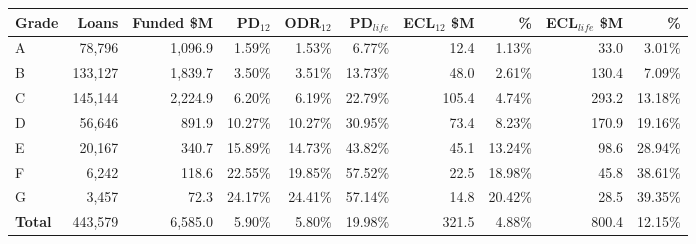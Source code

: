 \begin{tabular}{lrrrrrrrrr}
\toprule
Grade & Loans & Funded \$M & PD$_{12}$ & ODR$_{12}$ & PD$_{life}$ & ECL$_{12}$ \$M & \% & ECL$_{life}$ \$M & \% \\
\midrule
A & 78,796 & 1,096.9 & 1.59\% & 1.53\% & 6.77\% & 12.4 & 1.13\% & 33.0 & 3.01\% \\
B & 133,127 & 1,839.7 & 3.50\% & 3.51\% & 13.73\% & 48.0 & 2.61\% & 130.4 & 7.09\% \\
C & 145,144 & 2,224.9 & 6.20\% & 6.19\% & 22.79\% & 105.4 & 4.74\% & 293.2 & 13.18\% \\
D & 56,646 & 891.9 & 10.27\% & 10.27\% & 30.95\% & 73.4 & 8.23\% & 170.9 & 19.16\% \\
E & 20,167 & 340.7 & 15.89\% & 14.73\% & 43.82\% & 45.1 & 13.24\% & 98.6 & 28.94\% \\
F & 6,242 & 118.6 & 22.55\% & 19.85\% & 57.52\% & 22.5 & 18.98\% & 45.8 & 38.61\% \\
G & 3,457 & 72.3 & 24.17\% & 24.41\% & 57.14\% & 14.8 & 20.42\% & 28.5 & 39.35\% \\
\textbf{Total} & 443,579 & 6,585.0 & 5.90\% & 5.80\% & 19.98\% & 321.5 & 4.88\% & 800.4 & 12.15\% \\
\bottomrule
\end{tabular}
